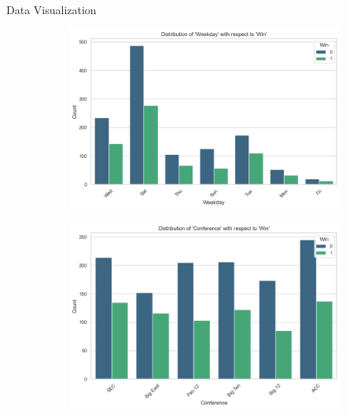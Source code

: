 \documentclass{beamer}
\begin{document}
\begin{frame}{Data Visualization}
\begin{figure}
\begin{subfigure}[b]{0.4\linewidth}
            \includegraphics[width=\linewidth]{images/weekday_win.png}
        \end{subfigure}
        \begin{subfigure}[b]{0.4\linewidth}
            \includegraphics[width=\linewidth]{images/conference_win.png}
        \end{subfigure}
    \end{figure}
\end{frame}


\end{document}
